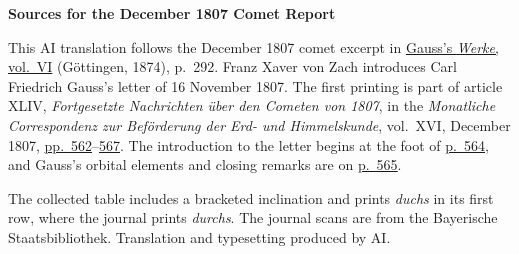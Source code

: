 \clearpage\thispagestyle{empty}
\begin{center}\textbf{Sources for the December 1807 Comet Report}\end{center}
\noindent This AI translation follows the December 1807 comet excerpt in \href{https://gdz.sub.uni-goettingen.de/id/PPN236007467}{Gauss’s \textit{Werke}, vol.~VI} (Göttingen, 1874), p.~292. Franz Xaver von Zach introduces Carl Friedrich Gauss’s letter of 16 November 1807. The first printing is part of article XLIV, \textit{Fortgesetzte Nachrichten über den Cometen von 1807}, in the \textit{Monatliche Correspondenz zur Beförderung der Erd- und Himmelskunde}, vol.~XVI, December 1807, \href{https://www.digitale-sammlungen.de/en/view/bsb10538607?page=576}{pp.~562}--\href{https://www.digitale-sammlungen.de/en/view/bsb10538607?page=581}{567}. The introduction to the letter begins at the foot of \href{https://www.digitale-sammlungen.de/en/view/bsb10538607?page=578}{p.~564}, and Gauss’s orbital elements and closing remarks are on \href{https://www.digitale-sammlungen.de/en/view/bsb10538607?page=579}{p.~565}.
\par\medskip
The collected table includes a bracketed inclination and prints \textit{duchs} in its first row, where the journal prints \textit{durchs}. The journal scans are from the Bayerische Staatsbibliothek. Translation and typesetting produced by AI.
\clearpage
